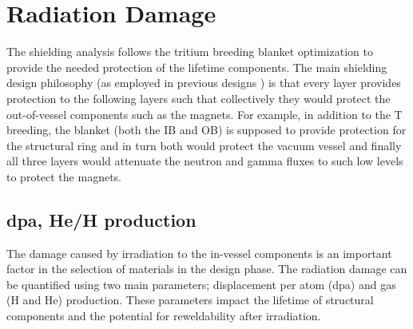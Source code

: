\documentclass[12pt, letterpaper]{elsarticle}
\begin{document}
\section{Radiation Damage} \label{Radiation Damage}
The shielding analysis follows the tritium breeding blanket optimization to provide the needed protection of the lifetime components. The main shielding design philosophy (as employed in previous designs \cite{ref_10}) is that every layer provides protection to the following layers such that collectively they would protect the out-of-vessel components such as the magnets. For example, in addition to the T breeding, the blanket (both the IB and OB) is supposed to provide protection for the structural ring and in turn both would protect the vacuum vessel and finally all three layers would attenuate the neutron and gamma fluxes to such low levels to protect the magnets.

\subsection{dpa, He/H production} \label{dpa, He/H production}
The damage caused by irradiation to the in-vessel components is an important factor in the selection of materials in the design phase. The radiation damage can be quantified using two main parameters; displacement per atom (dpa) and gas (H and He) production. These parameters impact the lifetime of structural components and the potential for reweldability after irradiation.\vspace{5mm}
\end{document}
